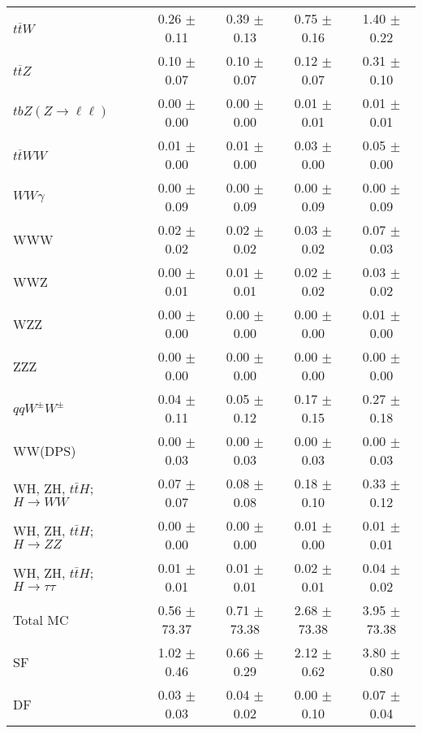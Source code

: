 \begin{tabular}{l|cccc}
                   $t\overline{t}W$ &  0.26 $\pm$  0.11 &  0.39 $\pm$  0.13 &  0.75 $\pm$  0.16 &  1.40 $\pm$  0.22 \\
                   $t\overline{t}Z$ &  0.10 $\pm$  0.07 &  0.10 $\pm$  0.07 &  0.12 $\pm$  0.07 &  0.31 $\pm$  0.10 \\
    $tbZ (Z \rightarrow \ell \ell)$ &  0.00 $\pm$  0.00 &  0.00 $\pm$  0.00 &  0.01 $\pm$  0.01 &  0.01 $\pm$  0.01 \\
                  $t\overline{t}WW$ &  0.01 $\pm$  0.00 &  0.01 $\pm$  0.00 &  0.03 $\pm$  0.00 &  0.05 $\pm$  0.00 \\
                         $WW\gamma$ &  0.00 $\pm$  0.09 &  0.00 $\pm$  0.09 &  0.00 $\pm$  0.09 &  0.00 $\pm$  0.09 \\
                                WWW &  0.02 $\pm$  0.02 &  0.02 $\pm$  0.02 &  0.03 $\pm$  0.02 &  0.07 $\pm$  0.03 \\
                                WWZ &  0.00 $\pm$  0.01 &  0.01 $\pm$  0.01 &  0.02 $\pm$  0.02 &  0.03 $\pm$  0.02 \\
                                WZZ &  0.00 $\pm$  0.00 &  0.00 $\pm$  0.00 &  0.00 $\pm$  0.00 &  0.01 $\pm$  0.00 \\
                                ZZZ &  0.00 $\pm$  0.00 &  0.00 $\pm$  0.00 &  0.00 $\pm$  0.00 &  0.00 $\pm$  0.00 \\
                 $qqW^{\pm}W^{\pm}$ &  0.04 $\pm$  0.11 &  0.05 $\pm$  0.12 &  0.17 $\pm$  0.15 &  0.27 $\pm$  0.18 \\
                            WW(DPS) &  0.00 $\pm$  0.03 &  0.00 $\pm$  0.03 &  0.00 $\pm$  0.03 &  0.00 $\pm$  0.03 \\
WH, ZH, $t\bar{t}H$; $H \rightarrow WW$ &  0.07 $\pm$  0.07 &  0.08 $\pm$  0.08 &  0.18 $\pm$  0.10 &  0.33 $\pm$  0.12 \\
WH, ZH, $t\bar{t}H$; $H \rightarrow ZZ$ &  0.00 $\pm$  0.00 &  0.00 $\pm$  0.00 &  0.01 $\pm$  0.00 &  0.01 $\pm$  0.01 \\
WH, ZH, $t\bar{t}H$; $H \rightarrow \tau\tau$ &  0.01 $\pm$  0.01 &  0.01 $\pm$  0.01 &  0.02 $\pm$  0.01 &  0.04 $\pm$  0.02 \\
\hline\hline
                           Total MC &  0.56 $\pm$ 73.37 &  0.71 $\pm$ 73.38 &  2.68 $\pm$ 73.38 &  3.95 $\pm$ 73.38 \\
\hline
                                 SF &  1.02 $\pm$  0.46 &  0.66 $\pm$  0.29 &  2.12 $\pm$  0.62 &  3.80 $\pm$  0.80 \\
                                 DF &  0.03 $\pm$  0.03 &  0.04 $\pm$  0.02 &  0.00 $\pm$  0.10 &  0.07 $\pm$  0.04 \\

\end{tabular}
